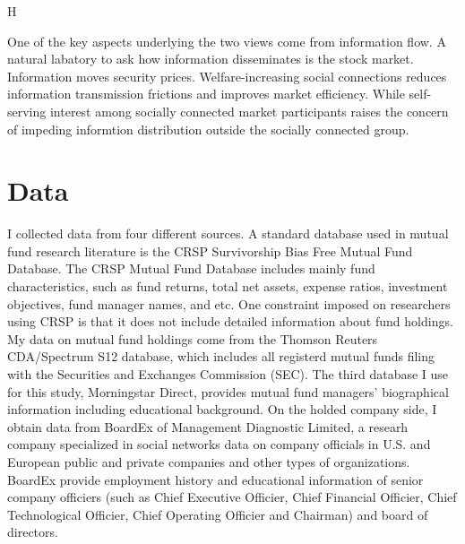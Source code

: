 \documentclass[11pt]{article}
\begin{document}
\begin{doublespace}
H 


One of the key aspects underlying the two views come from information flow. A natural labatory to ask how information disseminates is the stock market. Information moves security prices. Welfare-increasing social connections reduces information transmission frictions and improves market efficiency. While self-serving interest among socially connected market participants raises the concern of impeding informtion distribution outside the socially connected group.




 


\cite{putnam1994making}




\section{Data}
I collected data from four different sources. A standard database used in mutual fund research literature is the CRSP Survivorship Bias Free Mutual Fund Database. The CRSP Mutual Fund Database includes mainly fund characteristics, such as fund returns, total net assets, expense ratios, investment objectives, fund manager names, and etc. One constraint imposed on researchers using CRSP is that it does not include detailed information about fund holdings. 
My data on mutual fund holdings come from the Thomson Reuters CDA/Spectrum S12 database, which includes all registerd mutual funds filing with the Securities and Exchanges Commission (SEC). The third database I use for this study, Morningstar Direct, provides mutual fund managers' biographical information including educational background. On the holded company side, I obtain data from BoardEx of Management Diagnostic Limited, a researh company specialized in social networks data on company officials in U.S. and European public and private companies and other types of organizations. BoardEx provide employment history and educational information of senior company officiers (such as Chief Executive Officier, Chief Financial Officier, Chief Technological Officier, Chief Operating Officier and Chairman) and board of directors. 


\end{doublespace}
\end{document}
